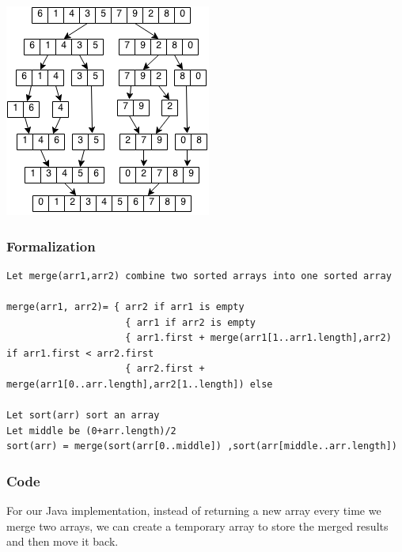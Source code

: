 \documentclass[11pt,oneside]{book}
\makeatletter
\def\maxwidth#1{\ifdim\Gin@nat@width>#1 #1\else\Gin@nat@width\fi}
\makeatother
\begin{document}
\vspace{5px}\includegraphics[width=\maxwidth{\textwidth}]{mergesort.png}

\subsubsection{Formalization}

\begin{lstlisting}
Let merge(arr1,arr2) combine two sorted arrays into one sorted array

merge(arr1, arr2)= { arr2 if arr1 is empty
                     { arr1 if arr2 is empty
                     { arr1.first + merge(arr1[1..arr1.length],arr2) if arr1.first < arr2.first
                     { arr2.first + merge(arr1[0..arr.length],arr2[1..length]) else

Let sort(arr) sort an array
Let middle be (0+arr.length)/2
sort(arr) = merge(sort(arr[0..middle]) ,sort(arr[middle..arr.length])
\end{lstlisting}

\subsubsection{Code}

For our Java implementation, instead of returning a new array every time we merge two arrays, we can create a temporary array to store the merged results and then move it back.
\end{document}
